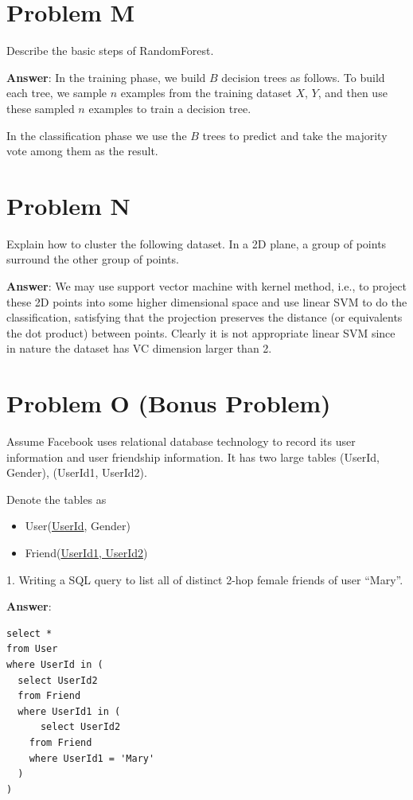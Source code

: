 \documentclass{article}
\begin{document}
\section{Problem M}
Describe the basic steps of RandomForest.

{\bf Answer}:
In the training phase, we build $B$ decision trees as follows. To build each tree, we sample $n$ examples from the training dataset $X$, $Y$, and then use these sampled $n$ examples to train a decision tree.

In the classification phase we use the $B$ trees to predict and take the majority vote among them as the result.

\section{Problem N}
Explain how to cluster the following dataset. In a 2D plane, a group of points surround the other group of points.

{\bf Answer}:
We may use support vector machine with kernel method, i.e., to project these 2D points into some higher dimensional space and use linear SVM to do the classification, satisfying that the projection preserves the distance (or equivalents the dot product) between points. Clearly it is not appropriate linear SVM since in nature the dataset has VC dimension larger than 2.

\section{Problem O (Bonus Problem)}
Assume Facebook uses relational database technology to record its user information and user friendship information. It has two large tables (UserId, Gender), (UserId1, UserId2).

Denote the tables as
\begin{itemize}
\item User(\underline{UserId}, Gender)
\item Friend(\underline{UserId1, UserId2})
\end{itemize}

1. Writing a SQL query to list all of distinct 2-hop female friends of user ``Mary''.

{\bf Answer}:
\begin{verbatim}
select *
from User
where UserId in (
  select UserId2
  from Friend
  where UserId1 in (
	  select UserId2
    from Friend
    where UserId1 = 'Mary'
  )
)
\end{verbatim}
\end{document}
